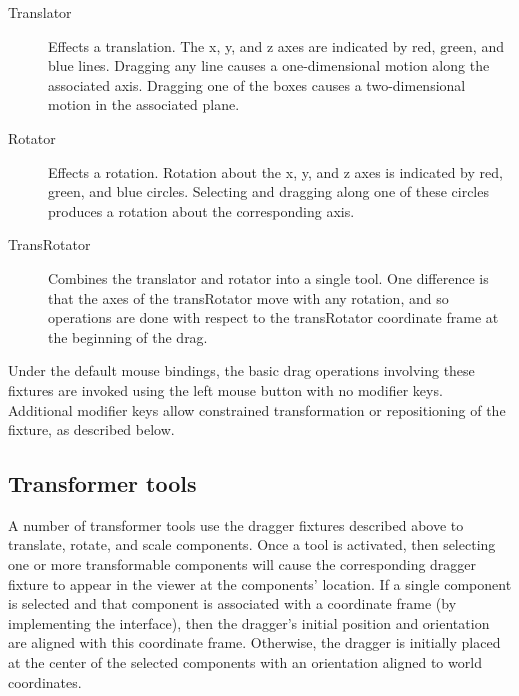 \documentclass{article}
\begin{document}
\begin{description}

\item[Translator]\mbox{}

Effects a translation. The x, y, and z axes are
indicated by red, green, and blue lines. Dragging any line causes
a one-dimensional motion along the associated axis. Dragging one
of the boxes causes a two-dimensional motion in the associated plane.

\item[Rotator]\mbox{}

Effects a rotation. Rotation about the
x, y, and z axes is indicated by red, green, and blue circles.
Selecting and dragging along one of these circles produces
a rotation about the corresponding axis.

\item[TransRotator]\mbox{}

Combines the translator and rotator into a single tool. One difference
is that the axes of the transRotator move with any rotation,
and so operations are done with respect to the transRotator coordinate frame
at the beginning of the drag.

\end{description}

\begin{sideblock}
Under the default mouse bindings, the basic drag operations involving
these fixtures are invoked using the left mouse button with no
modifier keys. Additional modifier keys allow constrained transformation
or repositioning of the fixture, as described below.
\end{sideblock}

\subsection{Transformer tools}
\label{TransformerToolsSec}

A number of transformer tools use the dragger fixtures described above
to translate, rotate, and scale components. Once a tool is activated,
then selecting one or more transformable components will cause the
corresponding dragger fixture to appear in the viewer at the
components' location. If a single component is selected and that
component is associated with a coordinate frame (by implementing the
 interface),
then the dragger's initial position and orientation are aligned with
this coordinate frame.  Otherwise, the dragger is initially placed at
the center of the selected components with an orientation aligned to
world coordinates.
\end{document}
